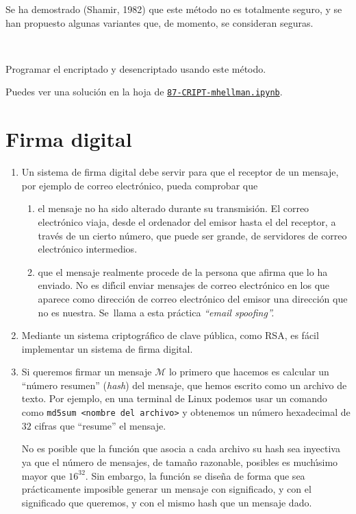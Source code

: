 Se ha demostrado (Shamir, 1982) que este m\'etodo no es totalmente seguro, y se
han propuesto algunas variantes que, de momento, se consideran seguras.

\

\begin{ejer}
Programar el encriptado y desencriptado usando este m\'etodo. 
\end{ejer}
Puedes ver una soluci\'on en la hoja de {\sage}
\href{http://localhost:8888/notebooks/CRIPT/??}{\tt 87-CRIPT-mhellman.ipynb}.

\section{Firma digital}
\begin{enumerate}
 \item Un sistema de {\sc firma digital} debe servir para que el receptor de un
mensaje, por ejemplo de correo electr\'onico,  pueda  comprobar que
\begin{enumerate}
 \item el mensaje no ha sido alterado durante su transmisi\'on. El correo
electr\'onico viaja,  desde el ordenador del emisor hasta el del receptor, a
trav\'es de un cierto n\'umero, que puede ser grande,  de servidores  de correo
electr\'onico intermedios. 
 \item que el mensaje realmente procede de la persona que afirma que lo ha
enviado. No es dif\'{\i}cil enviar mensajes de correo electr\'onico en los que
aparece como direcci\'on de correo electr\'onico del emisor una direcci\'on que
no es nuestra. Se~llama a esta pr\'actica {\itshape ``email spoofing''.}
\end{enumerate}

 \item Mediante un sistema criptogr\'afico de clave p\'ublica, como RSA,  es
f\'acil implementar un sistema de firma digital.

\item Si queremos firmar un mensaje $\mathcal{M}$ lo primero que hacemos es
calcular un ``n\'umero resumen'' ({\itshape hash}) del mensaje,  que hemos 
escrito
como un archivo de texto. Por ejemplo, en una terminal de Linux podemos usar un
comando como \verb=md5sum <nombre del archivo>= y 
obtenemos un n\'umero hexadecimal de $32$ cifras que ``resume'' el mensaje. 

No es posible que la funci\'on que asocia a cada archivo su hash sea inyectiva
ya que el n\'umero de mensajes, de tama\~no razonable,  posibles es
much\'{\i}simo mayor que $16^{32}$. Sin embargo, la funci\'on se dise\~na de
forma que sea pr\'acticamente imposible generar un mensaje con significado, y
con el significado que queremos, y con el mismo hash que un mensaje dado.


\end{enumerate}
